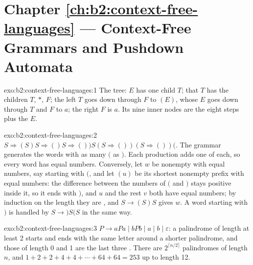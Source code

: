 \section*{Chapter \ref{ch:b2:context-free-languages} --- Context-Free Grammars and Pushdown Automata}

\begin{solution}{exo:b2:context-free-languages:1}
The tree: $E$ has one child $T$; that $T$ has the children $T$, $*$, $F$; the left $T$ goes down through $F$ to $(E)$,
whose $E$ goes down through $T$ and $F$ to $a$; the right $F$ is $a$. Its nine inner nodes are the eight steps plus the
 $E$.
\end{solution}

\begin{solution}{exo:b2:context-free-languages:2}
$S \Rightarrow (S)S \Rightarrow ()S \Rightarrow ())S(S \Rightarrow ())(S \Rightarrow ())($. The grammar generates the
words with as many $($ as $)$. Each production adds one of each, so every  word has equal numbers. Conversely,
let $w$ be nonempty with equal numbers, say starting with $($, and let $(u)$ be its shortest nonempty prefix with equal
numbers: the difference between the numbers of $($ and $)$ stays positive inside it, so it ends with $)$, and $u$ and
the rest $v$ both have equal numbers; by induction on the length they are , and $S \to (S)S$ gives $w$. A
word starting with $)$ is handled by $S \to )S(S$ in the same way.
\end{solution}

\begin{solution}{exo:b2:context-free-languages:3}
$P \to aPa \mid bPb \mid a \mid b \mid \varepsilon$: a palindrome of length at least 2 starts and ends with the same
letter around a shorter palindrome, and those of length 0 and 1 are the last three . There are $2^{\lceil
n/2 \rceil}$ palindromes of length $n$, and $1 + 2 + 2 + 4 + 4 + \cdots + 64 + 64 = 253$ up to length 12.
\end{solution}


